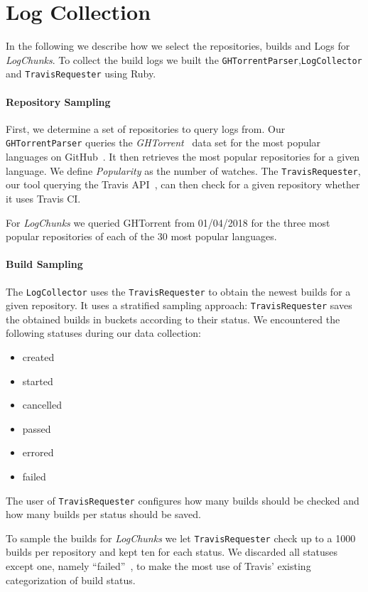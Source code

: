 \documentclass[\myrootdir/main.tex]{subfiles}
\begin{document}
\section{Log Collection}
In the following we describe how we select the repositories, builds and Logs for \emph{LogChunks}.
To collect the build logs we built the  \texttt{GHTorrentParser},\texttt{LogCollector} and \texttt{TravisRequester} using Ruby.

\paragraph{Repository Sampling}
First, we determine a set of repositories to query logs from.
Our \texttt{GHTorrentParser} queries the \emph{GHTorrent}~\cite{gousios2013ghtorrent} data set for the most popular languages on GitHub~\cite{github2019website}.
It then retrieves the most popular repositories for a given language.
We define \emph{Popularity} as the number of watches.
The \texttt{TravisRequester}, our tool querying the Travis API~\cite{travisci2019apidoc}, can then check for a given repository whether it uses Travis CI\@.

For \emph{LogChunks} we queried GHTorrent from 01/04/2018 for the three most popular repositories of each of the 30 most popular languages.

\paragraph{Build Sampling}
The \texttt{LogCollector} uses the \texttt{TravisRequester} to obtain the newest builds for a given repository.
It uses a stratified sampling approach: \texttt{TravisRequester} saves the obtained builds in buckets according to their status.
We encountered the following statuses during our data collection:
\begin{multicols}{3}
\begin{itemize}
	\item created
	\item started
	\item cancelled
	\item passed
	\item errored
	\item failed
\end{itemize}
\end{multicols}
The user of \texttt{TravisRequester} configures how many builds should be checked and how many builds per status should be saved.

To sample the builds for \emph{LogChunks} we let \texttt{TravisRequester} check up to a 1000 builds per repository and kept ten for each status.
We discarded all statuses except one, namely ``failed''~\cite{travis2009buildstatus}, to make the most use of Travis' existing categorization of build status.
\end{document}
